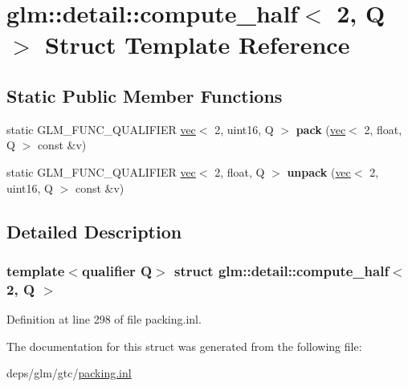 \hypertarget{structglm_1_1detail_1_1compute__half_3_012_00_01Q_01_4}{}\section{glm\+:\+:detail\+:\+:compute\+\_\+half$<$ 2, Q $>$ Struct Template Reference}
\label{structglm_1_1detail_1_1compute__half_3_012_00_01Q_01_4}
\subsection*{Static Public Member Functions}
\begin{DoxyCompactItemize}
\item 
\mbox{\label{structglm_1_1detail_1_1compute__half_3_012_00_01Q_01_4_aee41de18808e48e59c26b1fcd66fbc00}} 
static G\+L\+M\+\_\+\+F\+U\+N\+C\+\_\+\+Q\+U\+A\+L\+I\+F\+I\+ER \hyperlink{structglm_1_1vec}{vec}$<$ 2, uint16, Q $>$ {\bfseries pack} (\hyperlink{structglm_1_1vec}{vec}$<$ 2, float, Q $>$ const \&v)
\item 
\mbox{\label{structglm_1_1detail_1_1compute__half_3_012_00_01Q_01_4_a14c541423f621ba292c968245435c6a7}} 
static G\+L\+M\+\_\+\+F\+U\+N\+C\+\_\+\+Q\+U\+A\+L\+I\+F\+I\+ER \hyperlink{structglm_1_1vec}{vec}$<$ 2, float, Q $>$ {\bfseries unpack} (\hyperlink{structglm_1_1vec}{vec}$<$ 2, uint16, Q $>$ const \&v)
\end{DoxyCompactItemize}


\subsection{Detailed Description}
\subsubsection*{template$<$qualifier Q$>$\newline
struct glm\+::detail\+::compute\+\_\+half$<$ 2, Q $>$}



Definition at line 298 of file packing.\+inl.



The documentation for this struct was generated from the following file\+:\begin{DoxyCompactItemize}
\item 
deps/glm/gtc/\hyperlink{packing_8inl}{packing.\+inl}\end{DoxyCompactItemize}
